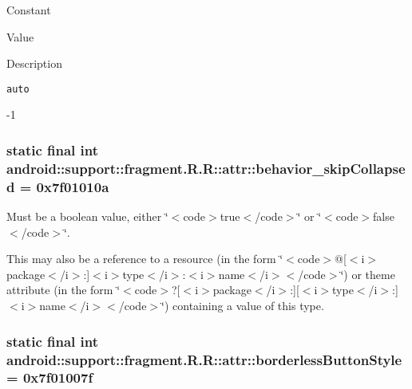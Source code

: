Constant

Value

Description 

{\tt auto}

-1\hypertarget{classandroid_1_1support_1_1fragment_1_1_r_1_1attr_558169750a7b091a2be4da77e6544d98}{
\subsubsection[{behavior\_\-skipCollapsed}]{\setlength{\rightskip}{0pt plus 5cm}static final int android::support::fragment.R.R::attr::behavior\_\-skipCollapsed = 0x7f01010a}}
\label{classandroid_1_1support_1_1fragment_1_1_r_1_1attr_558169750a7b091a2be4da77e6544d98}


Must be a boolean value, either \char`\"{}$<$code$>$true$<$/code$>$\char`\"{} or \char`\"{}$<$code$>$false$<$/code$>$\char`\"{}. 

This may also be a reference to a resource (in the form \char`\"{}$<$code$>$@\mbox{[}$<$i$>$package$<$/i$>$:\mbox{]}$<$i$>$type$<$/i$>$:$<$i$>$name$<$/i$>$$<$/code$>$\char`\"{}) or theme attribute (in the form \char`\"{}$<$code$>$?\mbox{[}$<$i$>$package$<$/i$>$:\mbox{]}\mbox{[}$<$i$>$type$<$/i$>$:\mbox{]}$<$i$>$name$<$/i$>$$<$/code$>$\char`\"{}) containing a value of this type. \hypertarget{classandroid_1_1support_1_1fragment_1_1_r_1_1attr_b3fa1022be0e87c89895333baa844a38}{
\subsubsection[{borderlessButtonStyle}]{\setlength{\rightskip}{0pt plus 5cm}static final int android::support::fragment.R.R::attr::borderlessButtonStyle = 0x7f01007f}}
\label{classandroid_1_1support_1_1fragment_1_1_r_1_1attr_b3fa1022be0e87c89895333baa844a38}


